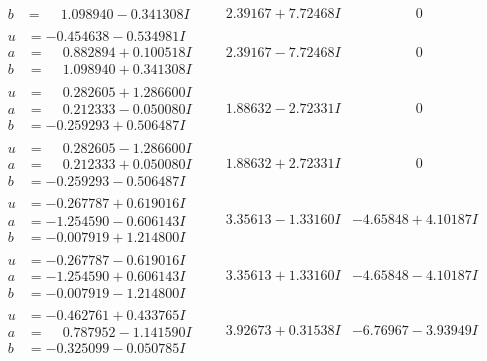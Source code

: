 \documentclass[1p]{elsarticle_modified}
\theoremstyle{definition}
\begin{document}
$$\begin{array}{c|c|c}
\begin{aligned}
b &= \phantom{-}1.098940 - 0.341308 I\end{aligned}
 & \phantom{-}2.39167 + 7.72468 I & \phantom{-0.000000 } 0 \\ \hline\begin{aligned}
u &= -0.454638 - 0.534981 I \\
a &= \phantom{-}0.882894 + 0.100518 I \\
b &= \phantom{-}1.098940 + 0.341308 I\end{aligned}
 & \phantom{-}2.39167 - 7.72468 I & \phantom{-0.000000 } 0 \\ \hline\begin{aligned}
u &= \phantom{-}0.282605 + 1.286600 I \\
a &= \phantom{-}0.212333 - 0.050080 I \\
b &= -0.259293 + 0.506487 I\end{aligned}
 & \phantom{-}1.88632 - 2.72331 I & \phantom{-0.000000 } 0 \\ \hline\begin{aligned}
u &= \phantom{-}0.282605 - 1.286600 I \\
a &= \phantom{-}0.212333 + 0.050080 I \\
b &= -0.259293 - 0.506487 I\end{aligned}
 & \phantom{-}1.88632 + 2.72331 I & \phantom{-0.000000 } 0 \\ \hline\begin{aligned}
u &= -0.267787 + 0.619016 I \\
a &= -1.254590 - 0.606143 I \\
b &= -0.007919 + 1.214800 I\end{aligned}
 & \phantom{-}3.35613 - 1.33160 I & -4.65848 + 4.10187 I \\ \hline\begin{aligned}
u &= -0.267787 - 0.619016 I \\
a &= -1.254590 + 0.606143 I \\
b &= -0.007919 - 1.214800 I\end{aligned}
 & \phantom{-}3.35613 + 1.33160 I & -4.65848 - 4.10187 I \\ \hline\begin{aligned}
u &= -0.462761 + 0.433765 I \\
a &= \phantom{-}0.787952 - 1.141590 I \\
b &= -0.325099 - 0.050785 I\end{aligned}
 & \phantom{-}3.92673 + 0.31538 I & -6.76967 - 3.93949 I \\ \hline\begin{aligned}

\end{aligned}
\end{array}$$
\end{document}
